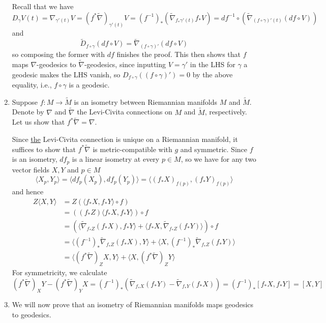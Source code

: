 \documentclass[a4paper, 12pt]{article}
\begin{document}
\begin{Exercise}
\begin{enumerate}[label=(\roman*)]
            Recall that we have
            \[
                D_\gamma V (t)
                = \nabla_{\gamma'(t)}V
                = (f^*\tilde{\nabla})_{\gamma'(t)}V
                = (f^{-1})_*(\tilde{\nabla}_{f_*\gamma'(t)} f_*V)
                = df^{-1}\circ(\tilde{\nabla}_{(f\circ\gamma)'(t)} (df\circ V))
            \]
            and
            \[
                \tilde{D}_{f\circ\gamma}(df\circ V)
                = \tilde{\nabla}_{(f\circ\gamma)'} (df\circ V)
            \]
            so composing the former with $df$ finishes the proof.
            This then shows that $f$ maps $\nabla$-geodesics to $\tilde{\nabla}$-geodesics,
            since inputting $V = \gamma'$ in the LHS for $\gamma$ a geodesic makes the LHS vanish,
            so $D_{f\circ\gamma}((f\circ\gamma)') = 0$ by the above equality, i.e., $f\circ\gamma$ is a geodesic.
        \item Suppose $f \colon M \to \tilde{M}$ is an isometry between Riemannian manifolds $M$ and $\tilde{M}$.
            Denote by $\nabla$ and $\tilde{\nabla}$ the Levi-Civita connections on $M$ and $\tilde{M}$, respectively.
            Let us show that $f^*\tilde{\nabla} = \nabla$.

            Since \underline{the} Levi-Civita connection is unique on a Riemannian manifold,
            it suffices to show that $f^*\tilde{\nabla}$ is metric-compatible with $g$ and symmetric.
            Since $f$ is an isometry, $df_p$ is a linear isometry at every $p \in M$,
            so we have for any two vector fields $X, Y$ and $p \in M$
            \[
                \langle X_p, Y_p \rangle
                = \langle df_p(X_p), df_p(Y_p) \rangle = \langle (f_*X)_{f(p)}, (f_*Y)_{f(p)}\rangle
            \]
            and hence
            \begin{align*}
                Z \langle X, Y \rangle
                &= Z(\langle f_*X, f_*Y \rangle \circ f) \\
                &= ((f_*Z) \langle f_*X, f_*Y \rangle) \circ f \\
                &= (\langle \tilde{\nabla}_{f_*Z}(f_*X), f_*Y \rangle + \langle f_*X, \tilde{\nabla}_{f_*Z}(f_*Y) \rangle )\circ f \\
                &= \langle (f^{-1})_* \tilde{\nabla}_{f_*Z}(f_*X), Y \rangle + \langle X, (f^{-1})_*\tilde{\nabla}_{f_*Z}(f_*Y) \rangle \\
                &= \langle (f^*\tilde{\nabla})_Z X, Y \rangle + \langle X, (f^* \tilde{\nabla})_Z Y \rangle
            \end{align*}
            For symmetricity, we calculate
            \[
                (f^*\tilde{\nabla})_X Y - (f^*\tilde{\nabla})_Y X
                = (f^{-1})_* (\tilde{\nabla}_{f_*X}(f_*Y) - \tilde{\nabla}_{f_*Y}(f_*X))
                = (f^{-1})_* [f_*X, f_*Y ]
                = [X, Y]
            \]
        \item We will now prove that an isometry of Riemannian manifolds maps geodesics to geodesics.


\end{enumerate}
\end{Exercise}
\end{document}

